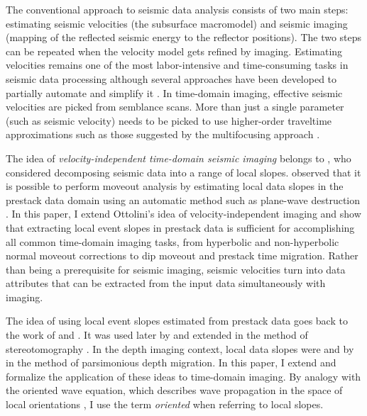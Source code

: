 The conventional approach to seismic data analysis \cite[]{yilmaz}
consists of two main steps: estimating seismic velocities (the
subsurface macromodel) and seismic imaging (mapping of the reflected
seismic energy to the reflector positions). The two steps can be
repeated when the velocity model gets refined by imaging. 
Estimating velocities remains one of the most
labor-intensive and time-consuming tasks in seismic data processing
although several approaches have been developed to partially automate
and simplify it \cite[]{SEG-1999-11621165,SEG-2003-20882091,lambare2}.
In time-domain imaging, effective seismic velocities are picked from
semblance scans. More than just a single parameter (such as seismic
velocity) needs to be picked to use higher-order traveltime
approximations such as those suggested by the multifocusing approach
\cite[]{gelchinsky,crs}.

The idea of \emph{velocity-independent time-domain seismic imaging} belongs to
\cite{Ottolini.sep.37.59}, who considered decomposing seismic data into a
range of local slopes.  \cite{wolf} 
 observed
that it is possible to perform moveout analysis by estimating local data
slopes in the prestack data domain using an automatic method such as
plane-wave destruction \cite[]{GEO67-06-19461960}.  In this paper, I extend
Ottolini's idea of velocity-independent imaging and show that extracting local
event slopes in prestack data is sufficient for accomplishing all common
time-domain imaging tasks, from hyperbolic and non-hyperbolic normal moveout
corrections to dip moveout and prestack time migration. Rather than being a
prerequisite for seismic imaging, seismic velocities turn into data attributes
that can be extracted from the input data simultaneously with imaging.

The idea of using local event slopes estimated from prestack 
data goes back to the work of \cite{GEO01-01-00970106} and
\cite{riabinkin}. It was used later by \cite{Sword.sepphd.55} and
extended in the method of stereotomography
\cite[]{billette,GEO68-03-10081021,lambare,SEG-2004-23672370}.  In the
depth imaging context, local data slopes were  and by
\cite{GEO68-03-10431051} in the method of parsimonious depth
migration. In this paper, I extend and formalize the application of
these ideas to time-domain imaging. By analogy with the oriented wave
equation, which describes wave propagation in the space of local
orientations \cite[]{SEG-2003-08930898}, I use the term
\emph{oriented} when referring to local slopes.

